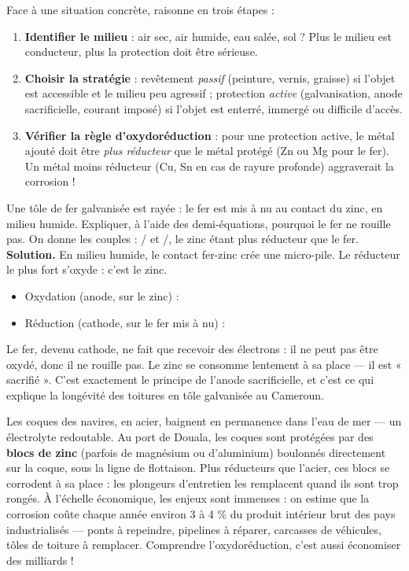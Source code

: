 \documentclass[11pt]{article}
\begin{document}
\begin{methode}
Face à une situation concrète, raisonne en trois étapes :
\begin{enumerate}
\item \textbf{Identifier le milieu} : air sec, air humide, eau salée, sol ? Plus le milieu est conducteur, plus la protection doit être sérieuse.
\item \textbf{Choisir la stratégie} : revêtement \emph{passif} (peinture, vernis, graisse) si l'objet est accessible et le milieu peu agressif ; protection \emph{active} (galvanisation, anode sacrificielle, courant imposé) si l'objet est enterré, immergé ou difficile d'accès.
\item \textbf{Vérifier la règle d'oxydoréduction} : pour une protection active, le métal ajouté doit être \emph{plus réducteur} que le métal protégé (Zn ou Mg pour le fer). Un métal moins réducteur (Cu, Sn en cas de rayure profonde) aggraverait la corrosion !
\end{enumerate}
\end{methode}

\begin{exoresolu}
Une tôle de fer galvanisée est rayée : le fer est mis à nu au contact du zinc, en milieu humide. Expliquer, à l'aide des demi-équations, pourquoi le fer ne rouille pas. On donne les couples : / et /, le zinc étant plus réducteur que le fer.
\tcblower
\textbf{Solution.} En milieu humide, le contact fer-zinc crée une micro-pile. Le réducteur le plus fort s'oxyde : c'est le zinc.
\begin{itemize}
\item Oxydation (anode, sur le zinc) : 
\item Réduction (cathode, sur le fer mis à nu) : 
\end{itemize}
Le fer, devenu cathode, ne fait que recevoir des électrons : il ne peut pas être oxydé, donc il ne rouille pas. Le zinc se consomme lentement à sa place — il est « sacrifié ». C'est exactement le principe de l'anode sacrificielle, et c'est ce qui explique la longévité des toitures en tôle galvanisée au Cameroun.
\end{exoresolu}

\begin{savaistu}
Les coques des navires, en acier, baignent en permanence dans l'eau de mer — un électrolyte redoutable. Au port de Douala, les coques sont protégées par des \textbf{blocs de zinc} (parfois de magnésium ou d'aluminium) boulonnés directement sur la coque, sous la ligne de flottaison. Plus réducteurs que l'acier, ces blocs se corrodent à sa place : les plongeurs d'entretien les remplacent quand ils sont trop rongés. À l'échelle économique, les enjeux sont immenses : on estime que la corrosion coûte chaque année environ 3 à 4 \% du produit intérieur brut des pays industrialisés — ponts à repeindre, pipelines à réparer, carcasses de véhicules, tôles de toiture à remplacer. Comprendre l'oxydoréduction, c'est aussi économiser des milliards !
\end{savaistu}
\end{document}
